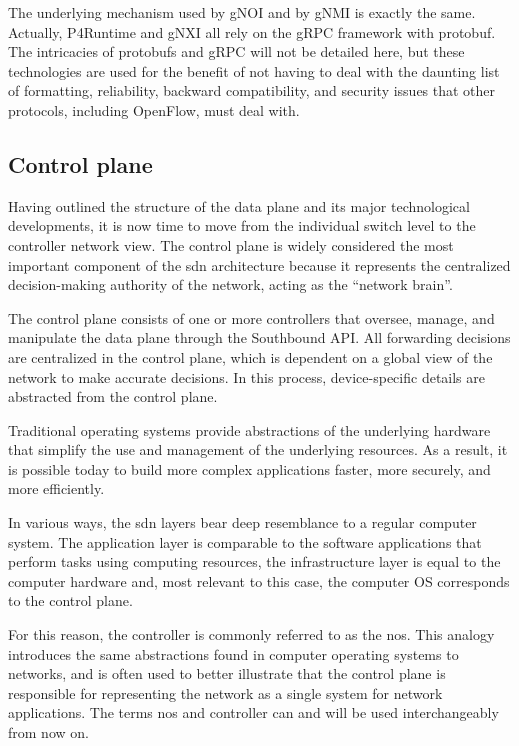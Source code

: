 The underlying mechanism used by gNOI and by gNMI is exactly the same\cite{peterson_software-defined_2021}. Actually, P4Runtime and gNXI all rely on the gRPC framework with protobuf\cite{hauser_survey_2021}. The intricacies of protobufs and gRPC will not be detailed here, but these technologies are used for the benefit of not having to deal with the daunting list of formatting, reliability, backward compatibility, and security issues that other protocols, including OpenFlow, must deal with\cite{peterson_software-defined_2021}.

   
\subsection{Control plane} %

Having outlined the structure of the data plane and its major technological developments, it is now time to move from the individual switch level to the controller network view. The control plane is widely considered the most important component of the \gls{sdn} architecture\cite{xia_survey_2015} because it represents the centralized decision-making authority of the network, acting as the “network brain”\cite{kreutz_software-defined_2015}.

The control plane consists of one or more controllers that oversee, manage, and manipulate the data plane through the Southbound API. All forwarding decisions are centralized in the control plane, which is dependent on a global view of the network to make accurate decisions. In this process, device-specific details are abstracted from the control plane\cite{latif_comprehensive_2020}. 

Traditional operating systems provide abstractions of the underlying hardware that simplify the use and management of the underlying resources. As a result, it is possible today to build more complex applications faster, more securely, and more efficiently\cite{kreutz_software-defined_2015}. 

In various ways, the \gls{sdn} layers bear deep resemblance to a regular computer system\cite{thyagaturu_software_2016}. The application layer is comparable to the software applications that perform tasks using computing resources, the infrastructure layer is equal to the computer hardware and, most relevant to this case, the computer OS corresponds to the control plane. 

For this reason, the controller is commonly referred to as the \gls{nos}. This analogy introduces the same abstractions found in computer operating systems to networks\cite{kreutz_software-defined_2015}, and is often used to better illustrate that the control plane is responsible for representing the network as a single system for network applications\cite{nunes_survey_2014}. The terms \gls{nos} and controller can and will be used interchangeably from now on.

